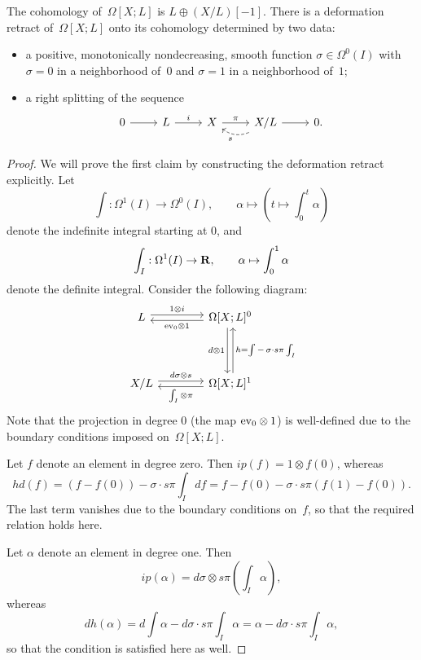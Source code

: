 \documentclass[12pt]{amsart}
\begin{document}
\begin{prop}
The cohomology of~$\Omega[X;L]$ is $L \oplus (X/L)[-1]$. There is a deformation retract of~$\Omega[X;L]$ onto its cohomology determined by two data:
\begin{itemize}
\item a  positive, monotonically nondecreasing, smooth function $\sigma \in \Omega^0(I)$ with $\sigma = 0$ in a neighborhood of~$0$ and $\sigma=1$ in a neighborhood of~$1$;
\item a right splitting of the sequence
\[
\begin{tikzcd}
0 \ar[r] & L \ar[r, "i"] & X \ar[r, "\pi"] & X/L \ar[r] \ar[l, dashed, bend left, "s"]& 0.
\end{tikzcd}
\]
\end{itemize}
\begin{proof}
We will prove the first claim by constructing the deformation retract explicitly. Let 
\[
\int: \Omega^1(I) \to \Omega^0(I), \qquad \alpha \mapsto \left( t \mapsto \int_0^t \alpha \right)
\] 
denote the indefinite integral starting at $0$, and 
\[
{\int_I} :\Omega^1(I) \to \mathbf{R}, 
\qquad \alpha \mapsto \int_0^1 \alpha
\]
denote the definite integral.
Consider the following diagram:
\[
\begin{tikzcd}[row sep = 4em, column sep = 4em]
L \ar[r, "1\otimes i", shift left] & \Omega[X;L]^0 \ar[d, "d \otimes 1"', shift right] \ar[l, shift left, "\ev_0 \otimes 1"] \\
X/L \ar[r, "d\sigma \otimes s", shift left] & \Omega[X;L]^1 \ar[l, shift left, "\int_I \otimes \pi"] \ar[u, shift right, "h = \int - \,\sigma\cdot s \pi \int_I"']
\end{tikzcd}
\]
Note that the projection in degree $0$ (the map ${\rm ev}_0 \otimes 1$) is well-defined due to the boundary conditions imposed on~$\Omega[X;L]$.

Let $f$ denote an element in degree zero. Then $ip(f) = 1 \otimes f(0)$, whereas 
\[
hd(f) = \left (f - f(0) \right) - \sigma \cdot s\pi  \int_I df = f - f(0) - \sigma \cdot s\pi \left( f(1) - f(0) \right).
\]
The last term vanishes due to the boundary conditions on~$f$, so that the required relation holds here.

Let $\alpha$ denote an element in degree one. Then 
\[
ip(\alpha) =d\sigma \otimes s \pi \left( \int_I \alpha \right) ,
\]
whereas
\[
dh(\alpha) = d \int \alpha - d\sigma \cdot s \pi \int_I \alpha = \alpha -  d\sigma \cdot s\pi \int_I \alpha,
\]
so that the condition is satisfied here as well.
\end{proof}
\end{prop}
\end{document}
